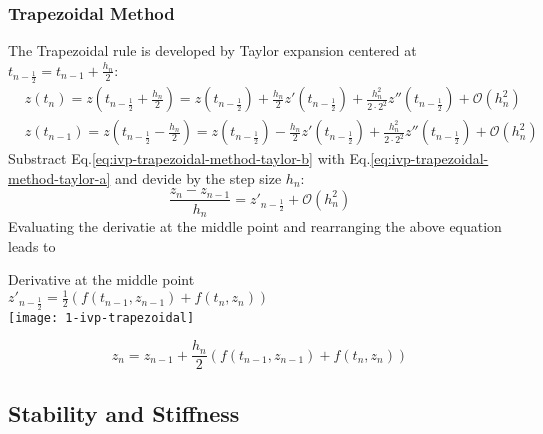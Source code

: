 \documentclass[letterpaper, 11pt]{article}
\begin{document}
\subsubsection{Trapezoidal Method}
\label{sec-1-1-3}
The Trapezoidal rule is developed by Taylor expansion centered at $t_{n-\frac{1}{2}}=t_{n-1} + \frac{h_{n}}{2}$:
\begin{subequations}
\label{eq:ivp-trapezoidal-method-taylor}
\begin{align}
\label{eq:ivp-trapezoidal-method-taylor-a}
&z(t_{n}) = z(t_{n-\frac{1}{2}} + \frac{h_{n}}{2}) = z(t_{n-\frac{1}{2}}) + \frac{h_{n}}{2}z'(t_{n-\frac{1}{2}}) + \frac{h_{n}^{2}}{2\cdot2^{2}}z''(t_{n-\frac{1}{2}}) + \mathcal{O}(h^{2}_{n}) \\
\label{eq:ivp-trapezoidal-method-taylor-b}
&z(t_{n-1}) = z(t_{n-\frac{1}{2}} - \frac{h_{n}}{2}) = z(t_{n-\frac{1}{2}}) - \frac{h_{n}}{2}z'(t_{n-\frac{1}{2}}) + \frac{h_{n}^{2}}{2\cdot2^{2}}z''(t_{n-\frac{1}{2}}) + \mathcal{O}(h^{2}_{n})
\end{align}
\end{subequations}
Substract Eq.\eqref{eq:ivp-trapezoidal-method-taylor-b} with Eq.\eqref{eq:ivp-trapezoidal-method-taylor-a} and devide by the step size $h_{n}$:
\begin{equation}
\label{eq:ivp-trapezoidal-step-a}
\frac{z_{n} - z_{n-1}}{h_{n}} = z'_{n-\frac{1}{2}} + \mathcal{O}(h^{2}_{n})
\end{equation}  
Evaluating the derivatie at the middle point and rearranging the above equation leads to
\begin{margintable}
\footnotesize
Derivative at the middle point\\
$z'_{n-\frac{1}{2}} = \frac{1}{2}\left (f(t_{n-1},z_{n-1}) + f(t_{n},z_{n})\right)$\\
\texttt{[image: 1-ivp-trapezoidal]}
\end{margintable}

\begin{equation}
\label{eq:ivp-trapezoidal-step-b}
z_{n} = z_{n-1} + \frac{h_{n}}{2}\left (f(t_{n-1},z_{n-1}) +  f(t_{n},z_{n})\right)
\end{equation} 
\subsection{Stability and Stiffness}
\label{sec-1-2}
\end{document}
